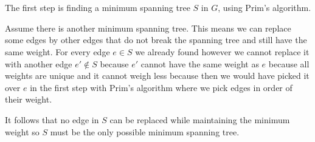 \documentclass[12pt, a4paper]{article}
\begin{document}
\section{} %

\section{} %

\section{} %

\section{} %

The first step is finding a minimum spanning tree $S$ in $G$, using Prim's algorithm.

Assume there is another minimum spanning tree. This means we can replace some edges by other edges that do not break the spanning tree and still have the same weight. For every edge $e \in S$ we already found however we cannot replace it with another edge $e' \not\in S$ because $e'$ cannot have the same weight as $e$ because all weights are unique and it cannot weigh less because then we would have picked it over $e$ in the first step with Prim's algorithm where we pick edges in order of their weight.

It follows that no edge in $S$ can be replaced while maintaining the minimum weight so $S$ must be the only possible minimum spanning tree.
\end{document}
